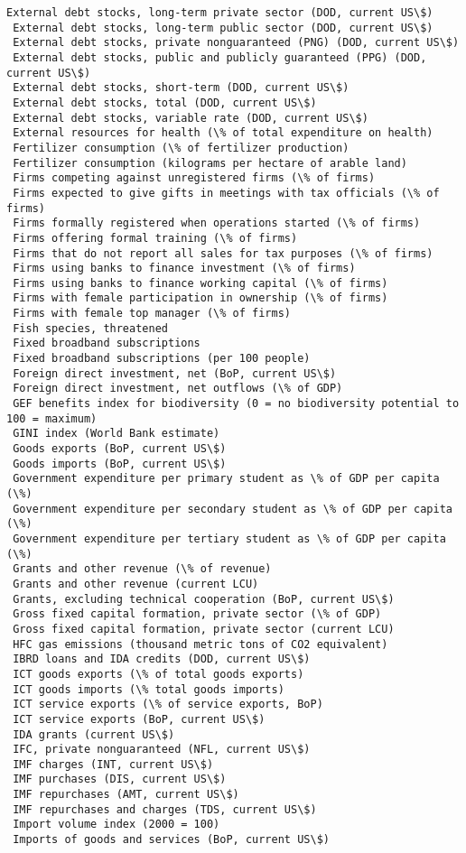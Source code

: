 \documentclass[11pt]{article}
\begin{document}
\begin{Verbatim}[commandchars=\\\{\}]
 External debt stocks, long-term private sector (DOD, current US\$)
 External debt stocks, long-term public sector (DOD, current US\$)
 External debt stocks, private nonguaranteed (PNG) (DOD, current US\$)
 External debt stocks, public and publicly guaranteed (PPG) (DOD, current US\$)
 External debt stocks, short-term (DOD, current US\$)
 External debt stocks, total (DOD, current US\$)
 External debt stocks, variable rate (DOD, current US\$)
 External resources for health (\% of total expenditure on health)
 Fertilizer consumption (\% of fertilizer production)
 Fertilizer consumption (kilograms per hectare of arable land)
 Firms competing against unregistered firms (\% of firms)
 Firms expected to give gifts in meetings with tax officials (\% of firms)
 Firms formally registered when operations started (\% of firms)
 Firms offering formal training (\% of firms)
 Firms that do not report all sales for tax purposes (\% of firms)
 Firms using banks to finance investment (\% of firms)
 Firms using banks to finance working capital (\% of firms)
 Firms with female participation in ownership (\% of firms)
 Firms with female top manager (\% of firms)
 Fish species, threatened
 Fixed broadband subscriptions
 Fixed broadband subscriptions (per 100 people)
 Foreign direct investment, net (BoP, current US\$)
 Foreign direct investment, net outflows (\% of GDP)
 GEF benefits index for biodiversity (0 = no biodiversity potential to 100 = maximum)
 GINI index (World Bank estimate)
 Goods exports (BoP, current US\$)
 Goods imports (BoP, current US\$)
 Government expenditure per primary student as \% of GDP per capita (\%)
 Government expenditure per secondary student as \% of GDP per capita (\%)
 Government expenditure per tertiary student as \% of GDP per capita (\%)
 Grants and other revenue (\% of revenue)
 Grants and other revenue (current LCU)
 Grants, excluding technical cooperation (BoP, current US\$)
 Gross fixed capital formation, private sector (\% of GDP)
 Gross fixed capital formation, private sector (current LCU)
 HFC gas emissions (thousand metric tons of CO2 equivalent)
 IBRD loans and IDA credits (DOD, current US\$)
 ICT goods exports (\% of total goods exports)
 ICT goods imports (\% total goods imports)
 ICT service exports (\% of service exports, BoP)
 ICT service exports (BoP, current US\$)
 IDA grants (current US\$)
 IFC, private nonguaranteed (NFL, current US\$)
 IMF charges (INT, current US\$)
 IMF purchases (DIS, current US\$)
 IMF repurchases (AMT, current US\$)
 IMF repurchases and charges (TDS, current US\$)
 Import volume index (2000 = 100)
 Imports of goods and services (BoP, current US\$)

\end{Verbatim}
\end{document}
